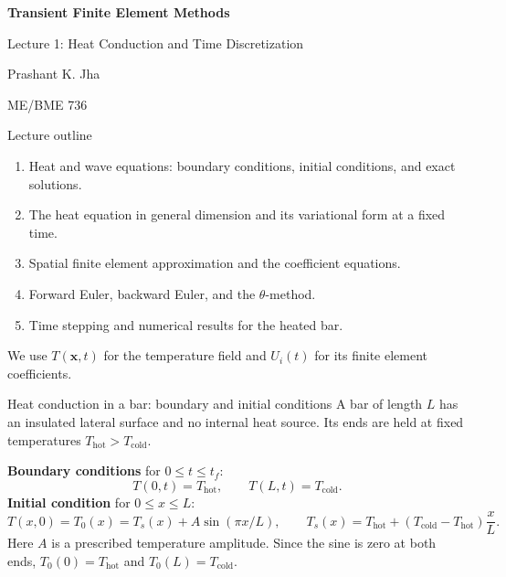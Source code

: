 \documentclass[11pt,aspectratio=169]{beamer}
\newcommand{\bx}{\bm x}
\newcommand{\Thot}{T_{\mathrm{hot}}}
\newcommand{\Tcold}{T_{\mathrm{cold}}}
\begin{document}
\begin{frame}
\centering\vfill
{\LARGE\bfseries Transient Finite Element Methods\par}
\vspace{0.45cm}
{\Large Lecture 1: Heat Conduction and Time Discretization\par}
\vspace{0.45cm}
Prashant K. Jha\par
ME/BME 736
\vfill
\end{frame}

\begin{frame}{Lecture outline}
\begin{enumerate}
\item Heat and wave equations: boundary conditions, initial conditions, and exact solutions.
\item The heat equation in general dimension and its variational form at a fixed time.
\item Spatial finite element approximation and the coefficient equations.
\item Forward Euler, backward Euler, and the $\theta$-method.
\item Time stepping and numerical results for the heated bar.
\end{enumerate}
\medskip
We use $T(\bx,t)$ for the temperature field and $U_i(t)$ for its finite
element coefficients.
\end{frame}

\begin{frame}{Heat conduction in a bar: boundary and initial conditions}
A bar of length $L$ has an insulated lateral surface and no internal heat source.
Its ends are held at fixed temperatures $\Thot>\Tcold$.
\begin{center}
\end{center}
\textbf{Boundary conditions} for $0\le t\le t_f$:
\[
T(0,t)=\Thot,\qquad T(L,t)=\Tcold.
\]
\textbf{Initial condition} for $0\le x\le L$:
\[
T(x,0)=T_0(x)=T_s(x)+A\sin(\pi x/L),\qquad
T_s(x)=\Thot+(\Tcold-\Thot)\frac{x}{L}.
\]
Here $A$ is a prescribed temperature amplitude.
Since the sine is zero at both ends, $T_0(0)=\Thot$ and $T_0(L)=\Tcold$.
\end{frame}
\end{document}
